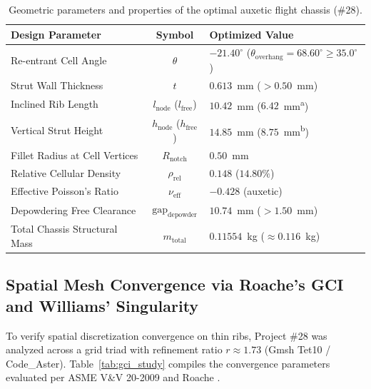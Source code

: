 \documentclass[preprint,12pt,3p]{elsarticle}
\begin{document}
\begin{table}[htb]
  \centering
  \caption{Geometric parameters and properties of the optimal auxetic flight chassis (\#28).}
  \label{tab:optimal_specs}
  \small
  \begin{tabular}{l c l}
    \toprule
    \textbf{Design Parameter} & \textbf{Symbol} & \textbf{Optimized Value} \\
    \midrule
    Re-entrant Cell Angle & $\theta$ & $-21.40^\circ$ ($\theta_{\text{overhang}} = 68.60^\circ \ge 35.0^\circ$) \\
    Strut Wall Thickness & $t$ & $0.613$~mm ($> 0.50$~mm) \\
    Inclined Rib Length & $l_{\text{node}}$ ($l_{\text{free}}$) & $10.42$~mm ($6.42$~mm\textsuperscript{a}) \\
    Vertical Strut Height & $h_{\text{node}}$ ($h_{\text{free}}$) & $14.85$~mm ($8.75$~mm\textsuperscript{b}) \\
    Fillet Radius at Cell Vertices & $R_{\text{notch}}$ & $0.50$~mm \\
    \midrule
    Relative Cellular Density & $\rho_{\text{rel}}$ & $0.148$ ($14.80\%$) \\
    Effective Poisson's Ratio & $\nu_{\text{eff}}$ & $-0.428$ (auxetic) \\
    Depowdering Free Clearance & $\text{gap}_{\text{depowder}}$ & $10.74$~mm ($> 1.50$~mm) \\
    Total Chassis Structural Mass & $m_{\text{total}}$ & $0.11554$~kg ($\approx 0.116$~kg) \\
    \bottomrule
  \end{tabular}
  \vspace{1ex}
  \footnotesize{}
\end{table}

\subsection{Spatial Mesh Convergence via Roache's GCI and Williams' Singularity}
To verify spatial discretization convergence on thin ribs, Project \#28 was analyzed across a grid triad with refinement ratio $r \approx 1.73$ (Gmsh Tet10 / Code\_Aster). Table~\ref{tab:gci_study} compiles the convergence parameters evaluated per ASME V\&V 20-2009 \cite{asme2009} and Roache \cite{roache1998}.
\end{document}
